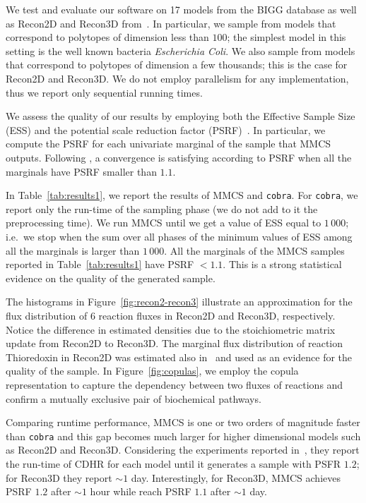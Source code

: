 \fi 
 
   We test and evaluate our software on 17 models from the BIGG database
   \citep{king2016bigg} as well as Recon2D and Recon3D 
   from~\citep{noronha2019virtual}. 
   In particular, we sample from models that correspond to polytopes of dimension less
   than $100$; the simplest model in this setting is the well known bacteria
   \textit{Escherichia Coli}. We also sample from models that correspond to
   polytopes of dimension a few thousands; this is the case for Recon2D and
   Recon3D. We do not employ parallelism for any implementation, thus we report
   only sequential running times.

   We assess the quality of our results by employing both the Effective Sample Size
   (ESS) and the potential scale reduction factor (PSRF)~\citep{Gelman92}. In
   particular, we compute the PSRF for each univariate marginal of the sample that
   MMCS outputs. Following \citep{Gelman92}, a convergence is satisfying according
   to PSRF when all the marginals have PSRF smaller than $1.1$.


   In Table~\ref{tab:results1}, we report the results of MMCS and \texttt{cobra}. 
   For \texttt{cobra}, we report only the run-time of the sampling phase (we do not add to it the preprocessing time). 
   We run MMCS until we get a value of ESS equal to $1\,000$; i.e.\ we stop
   when the sum over all phases of the minimum values of ESS among all the
   marginals is larger than $1\,000$. 
   All the marginals of the MMCS samples reported in Table~\ref{tab:results1} have PSRF $ < 1.1$. 
   This is a strong statistical evidence on the quality of the generated sample. 

   The histograms in Figure~\ref{fig:recon2-recon3} illustrate an approximation for the flux distribution of 6 reaction fluxes in Recon2D and Recon3D, respectively. 
   Notice the difference in estimated densities due to the stoichiometric matrix update from Recon2D to Recon3D. 
   \fi
   The marginal flux distribution of reaction Thioredoxin in Recon2D was estimated also in~\citep{Haraldsdottir17} and used as an evidence for the quality of the sample.  
   In Figure~\ref{fig:copulas}, we employ the copula representation to capture the dependency between two fluxes of reactions and confirm a mutually exclusive pair of biochemical pathways. 

   Comparing runtime performance,  MMCS is one or two orders of magnitude faster than \texttt{cobra} and this gap becomes much larger for higher dimensional models such as Recon2D and Recon3D. 
   Considering the experiments reported in~\citep{jadebeck2020hops}, they report the run-time of CDHR for each model until it generates a sample with PSFR $1.2$; for Recon3D they report $\sim 1$ day. 
   Interestingly, for Recon3D, MMCS achieves PSRF $1.2$ after $\sim 1$ hour while reach PSRF $1.1$ after $\sim 1$ day. 

